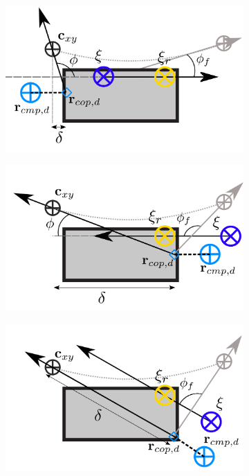 \begin{figure}[h]
\centering
  \begin{subfigure}{0.4\textwidth}
  \centering
  \includegraphics[width=.8\linewidth]{STYLESTUFF/ICPplanStartSSPhiViz.png}
   \caption{}
    \label{fig:phiViza}
  \end{subfigure}
  \begin{subfigure}{0.4\textwidth}
    \centering
  \includegraphics[width=.8\linewidth]{STYLESTUFF/ICPplanStartSSPhiVizNegError.png}
  \caption{}
   \label{fig:phiVizb}
  \end{subfigure}
  \begin{subfigure}{0.4\textwidth}
    \centering
  \includegraphics[width=.8\linewidth]{STYLESTUFF/ICPplanStartSSPhiViz0.png}

\end{subfigure}
\end{figure}
